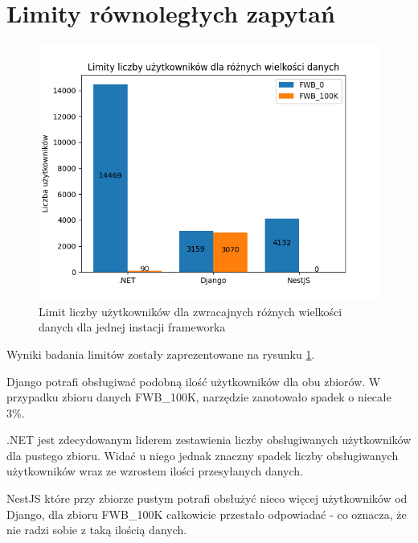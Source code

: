 \section{Limity równoległych zapytań}

\begin{figure}[!hb]
	\centering \includegraphics[width=1\linewidth]{rysunki/Limit_vus_for_different_datasets.png}
	\caption{Limit liczby użytkowników dla zwracajnych różnych wielkości danych dla jednej instacji frameworka}
	\label{rys:limit_vus}
\end{figure}

Wyniki badania limitów zostały zaprezentowane na rysunku \ref{rys:limit_vus}.

Django potrafi obsługiwać podobną ilość użytkowników dla obu zbiorów.
W przypadku zbioru danych FWB\_100K, narzędzie zanotowało spadek o niecałe 3\%.

.NET jest zdecydowanym liderem zestawienia liczby obsługiwanych użytkowników dla pustego zbioru. 
Widać u niego jednak znaczny spadek liczby obsługiwanych użytkowników wraz ze wzrostem ilości przesyłanych danych.

NestJS które przy zbiorze pustym potrafi obsłużyć nieco więcej użytkowników od Django, dla zbioru FWB\_100K całkowicie przestało odpowiadać - co oznacza, że nie radzi sobie z taką ilością danych.


